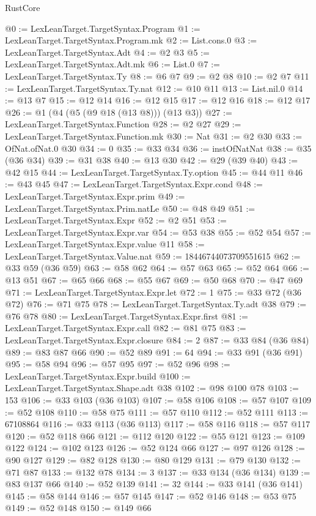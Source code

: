 \begin{lexlean}{RustCore}
\begin{coremodule}
@0 := LexLeanTarget.TargetSyntax.Program
@1 := LexLeanTarget.TargetSyntax.Program.mk
@2 := List.cons.{0}
@3 := LexLeanTarget.TargetSyntax.Adt
@4 := @2 @3
@5 := LexLeanTarget.TargetSyntax.Adt.mk
@6 := List.{0}
@7 := LexLeanTarget.TargetSyntax.Ty
@8 := @6 @7
@9 := @2 @8
@10 := @2 @7
@11 := LexLeanTarget.TargetSyntax.Ty.nat
@12 := @10 @11
@13 := List.nil.{0}
@14 := @13 @7
@15 := @12 @14
@16 := @12 @15
@17 := @12 @16
@18 := @12 @17
@26 := @1 (@4 (@5 (@9 @18 (@13 @8))) (@13 @3))
@27 := LexLeanTarget.TargetSyntax.Function
@28 := @2 @27
@29 := LexLeanTarget.TargetSyntax.Function.mk
@30 := Nat
@31 := @2 @30
@33 := OfNat.ofNat.{0} @30
@34 := 0
@35 := @33 @34
@36 := instOfNatNat
@38 := @35 (@36 @34)
@39 := @31 @38
@40 := @13 @30
@42 := @29 (@39 @40)
@43 := @42 @15
@44 := LexLeanTarget.TargetSyntax.Ty.option
@45 := @44 @11
@46 := @43 @45
@47 := LexLeanTarget.TargetSyntax.Expr.cond
@48 := LexLeanTarget.TargetSyntax.Expr.prim
@49 := LexLeanTarget.TargetSyntax.Prim.natLe
@50 := @48 @49
@51 := LexLeanTarget.TargetSyntax.Expr
@52 := @2 @51
@53 := LexLeanTarget.TargetSyntax.Expr.var
@54 := @53 @38
@55 := @52 @54
@57 := LexLeanTarget.TargetSyntax.Expr.value @11
@58 := LexLeanTarget.TargetSyntax.Value.nat
@59 := 18446744073709551615
@62 := @33 @59 (@36 @59)
@63 := @58 @62
@64 := @57 @63
@65 := @52 @64
@66 := @13 @51
@67 := @65 @66
@68 := @55 @67
@69 := @50 @68
@70 := @47 @69
@71 := LexLeanTarget.TargetSyntax.Expr.let
@72 := 1
@75 := @33 @72 (@36 @72)
@76 := @71 @75
@78 := LexLeanTarget.TargetSyntax.Ty.adt @38
@79 := @76 @78
@80 := LexLeanTarget.TargetSyntax.Expr.first
@81 := LexLeanTarget.TargetSyntax.Expr.call
@82 := @81 @75
@83 := LexLeanTarget.TargetSyntax.Expr.closure
@84 := 2
@87 := @33 @84 (@36 @84)
@89 := @83 @87 @66
@90 := @52 @89
@91 := 64
@94 := @33 @91 (@36 @91)
@95 := @58 @94
@96 := @57 @95
@97 := @52 @96
@98 := LexLeanTarget.TargetSyntax.Expr.build
@100 := LexLeanTarget.TargetSyntax.Shape.adt @38
@102 := @98 @100 @78
@103 := 153
@106 := @33 @103 (@36 @103)
@107 := @58 @106
@108 := @57 @107
@109 := @52 @108
@110 := @58 @75
@111 := @57 @110
@112 := @52 @111
@113 := 67108864
@116 := @33 @113 (@36 @113)
@117 := @58 @116
@118 := @57 @117
@120 := @52 @118 @66
@121 := @112 @120
@122 := @55 @121
@123 := @109 @122
@124 := @102 @123
@126 := @52 @124 @66
@127 := @97 @126
@128 := @90 @127
@129 := @82 @128
@130 := @80 @129
@131 := @79 @130
@132 := @71 @87
@133 := @132 @78
@134 := 3
@137 := @33 @134 (@36 @134)
@139 := @83 @137 @66
@140 := @52 @139
@141 := 32
@144 := @33 @141 (@36 @141)
@145 := @58 @144
@146 := @57 @145
@147 := @52 @146
@148 := @53 @75
@149 := @52 @148
@150 := @149 @66

\end{coremodule}
\end{lexlean}
